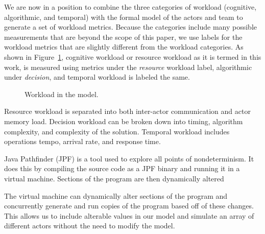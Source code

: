 \documentclass[letterpaper]{article}
\begin{document}
We are now in a position to combine the three categories of workload (cognitive, algorithmic, and temporal) with the formal model of the actors and team to generate a set of workload metrics.  Because the categories include many possible measurements that are beyond the scope of this paper, we use labels for the workload metrics that are slightly different from the workload categories.  As shown in Figure~\ref{fig:WorkloadMetrics}, cognitive workload or resource workload as it is termed in this work, is measured using metrics under the {\em resource} workload label, algorithmic under {\em decision}, and temporal workload is labeled the same. 


\begin{figure}[h]
\center
\setlength{\abovecaptionskip}{1mm}
\setlength{\belowcaptionskip}{1mm}
\setlength{\textfloatsep}{1mm}
\setlength{\floatsep}{1mm}
\caption{Workload in the model.}
\label{fig:WorkloadMetrics}
\end{figure}

Resource workload is separated into both inter-actor communication and actor
memory load. Decision workload can be broken down into timing, algorithm complexity, and complexity of the solution. Temporal workload includes operations tempo, arrival rate, and response time.

Java Pathfinder (JPF) is a tool used to explore all points of nondeterminism.
It does this by compiling the source code as a JPF binary and
running it in a virtual machine.
Sections of the program are then dynamically altered 

The virtual machine can dynamically alter sections of the program and concurrently generate and run copies of the program
based off of these changes. This allows us to include alterable values in our
model and simulate an array of different actors without the need to modify the
model.
\end{document}
